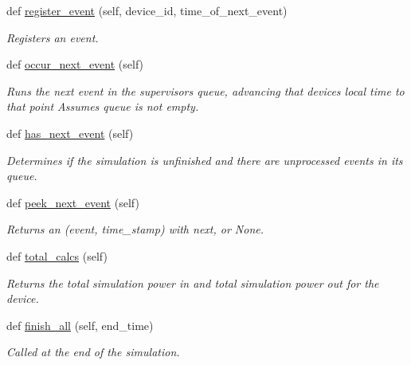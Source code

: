 \begin{DoxyCompactItemize}
def \hyperlink{class_build_1_1_simulation___operation_1_1supervisor_1_1_supervisor_aaa1358b86023cb1cdb458103f2981025}{register\+\_\+event} (self, device\+\_\+id, time\+\_\+of\+\_\+next\+\_\+event)
\begin{DoxyCompactList}\small\item\em Registers an event. \end{DoxyCompactList}\item 
def \hyperlink{class_build_1_1_simulation___operation_1_1supervisor_1_1_supervisor_a8a8141714cc3cafb919978e5297d3071}{occur\+\_\+next\+\_\+event} (self)
\begin{DoxyCompactList}\small\item\em Runs the next event in the supervisor\textquotesingle{}s queue, advancing that device\textquotesingle{}s local time to that point Assumes queue is not empty. \end{DoxyCompactList}\item 
\mbox{\label{class_build_1_1_simulation___operation_1_1supervisor_1_1_supervisor_afc3f4f66bc91c1bf381bdfdcfea064f7}} 
def \hyperlink{class_build_1_1_simulation___operation_1_1supervisor_1_1_supervisor_afc3f4f66bc91c1bf381bdfdcfea064f7}{has\+\_\+next\+\_\+event} (self)
\begin{DoxyCompactList}\small\item\em Determines if the simulation is unfinished and there are unprocessed events in its queue. \end{DoxyCompactList}\item 
def \hyperlink{class_build_1_1_simulation___operation_1_1supervisor_1_1_supervisor_a6b25fce4bb7e5845c17427db1cbdd6fe}{peek\+\_\+next\+\_\+event} (self)
\begin{DoxyCompactList}\small\item\em Returns an (event, time\+\_\+stamp) with next, or None. \end{DoxyCompactList}\item 
def \hyperlink{class_build_1_1_simulation___operation_1_1supervisor_1_1_supervisor_a27f0aa77cedb9b74d8d8d93ab702b01a}{total\+\_\+calcs} (self)
\begin{DoxyCompactList}\small\item\em Returns the total simulation power in and total simulation power out for the device. \end{DoxyCompactList}\item 
def \hyperlink{class_build_1_1_simulation___operation_1_1supervisor_1_1_supervisor_aeffb9fb0fc359bc0be65cbc8b23b1deb}{finish\+\_\+all} (self, end\+\_\+time)
\begin{DoxyCompactList}\small\item\em Called at the end of the simulation. \end{DoxyCompactList}\end{DoxyCompactItemize}


